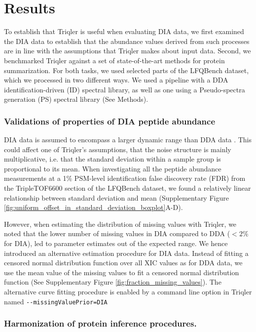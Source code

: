 \documentclass[10pt,letterpaper]{article}
\begin{document}
\section*{Results}

To establish that Triqler is useful when evaluating DIA data, we first examined the DIA data to establish that the abundance values derived from such processes are in line with the assumptions that Triqler makes about input data. Second, we benchmarked Triqler against a set of state-of-the-art methods for protein summarization. For both tasks, we used selected parts of the LFQBench dataset, which we processed in two different ways. We used a pipeline with a DDA identification-driven (ID) spectral library, as well as one using a Pseudo-spectra generation (PS) spectral library (See Methods).


\subsubsection*{Validations of properties of DIA peptide abundance}

DIA data is assumed to encompass a larger dynamic range than DDA data . This could affect one of Triqler's assumptions, that the noise structure is mainly multiplicative, i.e. that the standard deviation within a sample group is proportional to its mean. When investigating all the peptide abundance measurements at a 1\% PSM-level identification false discovery rate (FDR) from the TripleTOF6600 section of the LFQBench dataset, we found a relatively linear relationship between standard deviation and mean (Supplementary Figure \ref{fig:uniform_offset_in_standard_deviation_boxplot}A-D). 

However, when estimating the distribution of missing values with Triqler, we noted that the lower number of missing values in DIA compared to DDA ($<2\%$ for DIA), led to parameter estimates out of the expected range. We hence introduced an alternative estimation procedure for DIA data. Instead of fitting a censored normal distribution function over all XIC values as for DDA data, we use the mean value of the missing values to fit a censored normal distribution function (See Supplementary Figure \ref{fig:fraction_missing_values}). The alternative curve fitting procedure is enabled by a command line option in Triqler named \verb|--missingValuePrior=DIA|

\subsubsection*{Harmonization of protein inference procedures.}
\end{document}

